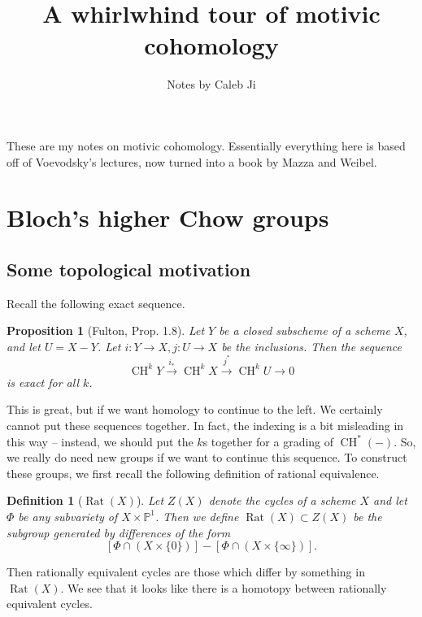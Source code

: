 \documentclass[a4paper, 11pt]{article} %
\title{A whirlwhind tour of motivic cohomology}
\author{Notes by Caleb Ji}
\date{}
\newtheorem{proposition}[theorem]{Proposition}
\newtheorem{definition}[theorem]{Definition}
\theoremstyle{remark}
\newcommand{\?}{{\color{red} ???}}
\newcommand{\mb}{\mathbb}
\renewcommand{\P}{\mb{P}}
\DeclareMathOperator{\CH}{CH}
\DeclareMathOperator{\Rat}{Rat}
\begin{document}



\maketitle 

These are my notes on motivic cohomology.  Essentially everything here is based off of Voevodsky's lectures, now turned into a book by Mazza and Weibel. \cite{Voevodsky} 

\tableofcontents 

\section{Bloch's higher Chow groups}

\subsection{Some topological motivation} 
Recall the following exact sequence. 

\begin{proposition}
[Fulton, Prop. 1.8] Let $Y$ be a closed subscheme of a scheme $X$, and let $U=X-Y$.  Let $i:Y\rightarrow X, j:U\rightarrow X$ be the inclusions.  Then the sequence 
\[
\CH^kY\xrightarrow{i_*}\CH^kX\xrightarrow{j^*}\CH^kU\rightarrow 0
\]
is exact for all $k$.
\end{proposition} 

This is great, but if we want homology to continue to the left.  We certainly cannot put these sequences together.  In fact, the indexing is a bit misleading in this way -- instead, we should put the $k$s together for a grading of $\CH^*(-)$.  So, we really do need new groups if we want to continue this sequence.  To construct these groups, we first recall the following definition of rational equivalence. 

\begin{definition}
[$\Rat(X)$]
Let $Z(X)$ denote the cycles of a scheme $X$ and let $\Phi$ be any subvariety of $X\times \P^1$.  Then we define $\Rat(X)\subset Z(X)$ be the subgroup generated by differences of the form 
\[
[\Phi\cap (X\times \{0\})] - [\Phi\cap (X\times \{\infty\})].
\]
\end{definition}
Then rationally equivalent cycles are those which differ by something in $\Rat(X)$.  We see that it looks like there is a homotopy between rationally equivalent cycles. \\  
\end{document}
